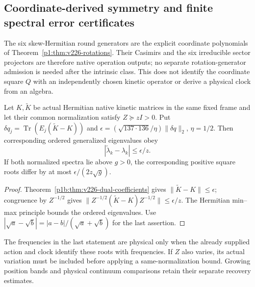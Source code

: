 \documentclass[11pt,a4paper]{article}
\begin{document}
\subsection{Coordinate-derived symmetry and finite spectral error certificates}
\label{p2d:sec:v226-spectral-propagation}
The six skew-Hermitian round generators are the explicit coordinate
polynomials of Theorem~\ref{p1:thm:v226-rotations}. Their Casimirs and the
six irreducible sector projectors are therefore native operation outputs;
no separate rotation-generator admission is needed after the intrinsic
class. This does not identify the coordinate square $Q$ with an independently
chosen kinetic operator or derive a physical clock from an algebra.

\begin{proposition}
\label{p2d:prop:v226-coefficient-spectral-error}
Let $K,\widetilde K$ be actual Hermitian native kinetic matrices in the
same fixed frame and let their common normalization satisfy $Z\succeq zI>0$.
Put $\delta q_j=\operatorname{Tr}(E_j(\widetilde K-K))$ and
$\epsilon=(\sqrt{137\cdot136}/\eta)\|\delta q\|_2$, $\eta=1/2$.
Then corresponding ordered generalized eigenvalues obey
\[
 |\widetilde\lambda_k-\lambda_k|\le\epsilon/z.
\]
If both normalized spectra lie above $g>0$, the corresponding positive
square roots differ by at most $\epsilon/(2z\sqrt g)$.
\end{proposition}
\begin{proof}
Theorem~\ref{p1b:thm:v226-dual-coefficients} gives
$\|\widetilde K-K\|\le\epsilon$; congruence by $Z^{-1/2}$ gives
$\|Z^{-1/2}(\widetilde K-K)Z^{-1/2}\|\le\epsilon/z$.
The Hermitian min--max principle bounds the ordered eigenvalues.
Use $|\sqrt a-\sqrt b|=|a-b|/(\sqrt a+\sqrt b)$ for the last assertion.
\end{proof}
The frequencies in the last statement are physical only when the already
supplied action and clock identify these roots with frequencies. If $Z$
also varies, its actual variation must be included before applying a
same-normalization bound. Growing position bands and physical continuum
comparisons retain their separate recovery estimates.
\end{document}
